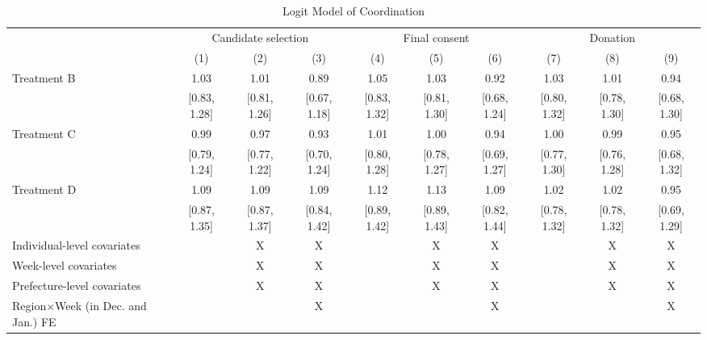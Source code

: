 \documentclass[12pt, a4paper]{article}
\begin{document}
\begin{landscape}\begin{table}[H]

\caption{\label{tab:coordinate-logit}Logit Model of Coordination}
\centering
\fontsize{8}{10}\selectfont
\begin{threeparttable}
\begin{tabular}[t]{lccccccccc}
\toprule
\multicolumn{1}{c}{ } & \multicolumn{3}{c}{Candidate selection} & \multicolumn{3}{c}{Final consent} & \multicolumn{3}{c}{Donation} \\
\cmidrule(l{3pt}r{3pt}){2-4} \cmidrule(l{3pt}r{3pt}){5-7} \cmidrule(l{3pt}r{3pt}){8-10}
  & (1) & (2) & (3) & (4) & (5) & (6) & (7) & (8) & (9)\\
\midrule
Treatment B & \num{1.03} & \num{1.01} & \num{0.89} & \num{1.05} & \num{1.03} & \num{0.92} & \num{1.03} & \num{1.01} & \num{0.94}\\
 & {}[\num{0.83}, \num{1.28}] & {}[\num{0.81}, \num{1.26}] & {}[\num{0.67}, \num{1.18}] & {}[\num{0.83}, \num{1.32}] & {}[\num{0.81}, \num{1.30}] & {}[\num{0.68}, \num{1.24}] & {}[\num{0.80}, \num{1.32}] & {}[\num{0.78}, \num{1.30}] & {}[\num{0.68}, \num{1.30}]\\
Treatment C & \num{0.99} & \num{0.97} & \num{0.93} & \num{1.01} & \num{1.00} & \num{0.94} & \num{1.00} & \num{0.99} & \num{0.95}\\
 & {}[\num{0.79}, \num{1.24}] & {}[\num{0.77}, \num{1.22}] & {}[\num{0.70}, \num{1.24}] & {}[\num{0.80}, \num{1.28}] & {}[\num{0.78}, \num{1.27}] & {}[\num{0.69}, \num{1.27}] & {}[\num{0.77}, \num{1.30}] & {}[\num{0.76}, \num{1.28}] & {}[\num{0.68}, \num{1.32}]\\
Treatment D & \num{1.09} & \num{1.09} & \num{1.09} & \num{1.12} & \num{1.13} & \num{1.09} & \num{1.02} & \num{1.02} & \num{0.95}\\
 & {}[\num{0.87}, \num{1.35}] & {}[\num{0.87}, \num{1.37}] & {}[\num{0.84}, \num{1.42}] & {}[\num{0.89}, \num{1.42}] & {}[\num{0.89}, \num{1.43}] & {}[\num{0.82}, \num{1.44}] & {}[\num{0.78}, \num{1.32}] & {}[\num{0.78}, \num{1.32}] & {}[\num{0.69}, \num{1.29}]\\
\midrule
Individual-level covariates &  & X & X &  & X & X &  & X & X\\
Week-level covariates &  & X & X &  & X & X &  & X & X\\
Prefecture-level covariates &  & X & X &  & X & X &  & X & X\\
Region$\times$Week (in Dec. and Jan.) FE &  &  & X &  &  & X &  &  & X\\

\end{tabular}
\end{threeparttable}
\end{table}
\end{landscape}
\end{document}

